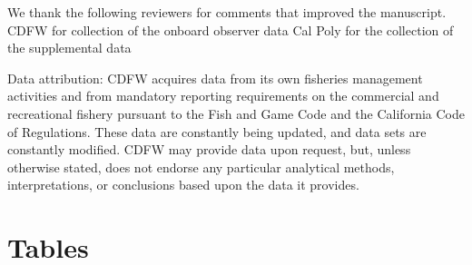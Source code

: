 \documentclass[
  12pt,
  authoryear,
  preprint,
  3p]{elsarticle}
\begin{document}
We thank the following reviewers for comments that improved the
manuscript. CDFW for collection of the onboard observer data Cal Poly
for the collection of the supplemental data

Data attribution: CDFW acquires data from its own fisheries management
activities and from mandatory reporting requirements on the commercial
and recreational fishery pursuant to the Fish and Game Code and the
California Code of Regulations. These data are constantly being updated,
and data sets are constantly modified. CDFW may provide data upon
request, but, unless otherwise stated, does not endorse any particular
analytical methods, interpretations, or conclusions based upon the data
it provides.

\hypertarget{tables}{%
\section{Tables}\label{tables}}

\FloatBarrier

\hypertarget{tbl-reefareas}{}
\begin{table}
\caption{\label{tbl-reefareas}Area of rocky habitat in state waters aggregated to the levels modelled
for each species. The merged cells for each species indicate which areas
of rocky habitat were aggregated to ensure appropriate samples sizes to
explore an area-weighted index. }\tabularnewline

\centering
{}
\end{table}
\end{document}
